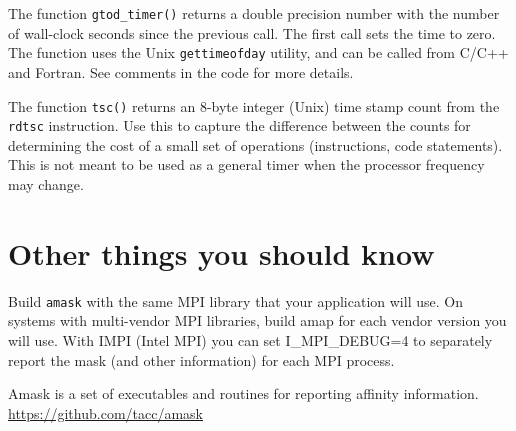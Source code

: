 \documentclass[10pt,a4paper]{report}
\begin{document}
The function \verb+gtod_timer()+ returns a double precision number with the number
of wall-clock seconds since the previous call.  The first call sets the time
to zero. The function uses the Unix \verb+gettimeofday+ utility, and  can be called from 
C/C++ and Fortran.  See comments in the code for
more details.

The function \verb+tsc()+ returns an 8-byte integer (Unix) time stamp count from
the \verb+rdtsc+ instruction. Use this to capture the difference between the counts for
determining 
the cost of a small set of operations (instructions, code statements). This is
not meant to be used as a general timer when the processor frequency may change.



\section{Other things you should know}
Build \verb+amask+ with the same MPI library that your 
application will use.  On systems with multi-vendor MPI libraries,
build amap for each vendor version you will use.
With IMPI (Intel MPI) you can set I\_MPI\_DEBUG=4 to
separately report the mask (and other information) for each MPI process. 


\FloatBarrier
{}
\begin{thebibliography}{00}


 Amask is a set of executables and routines for reporting affinity information. \href{https://github.com/tacc/amask}{https://github.com/tacc/amask}


\end{thebibliography}
\end{document}
